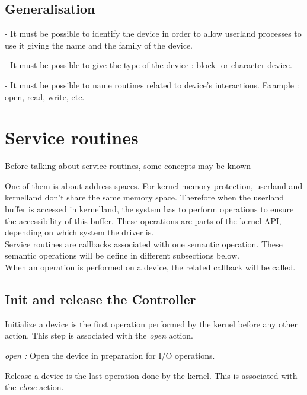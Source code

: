 \documentclass[11pt]{report}
\begin{document}
\subsection{Generalisation}
\begin{description}
  \item{- It must be possible to identify the device in order to allow userland processes
to use it giving the name and the family of the device.}
  \item{- It must be possible to give the type of the device : block- or character-device.}
  \item{- It must be possible to name routines related to device's interactions.
Example : open, read, write, etc.}
\end{description}

\section{Service routines}

Before talking about service routines, some concepts may be known

One of them is about address spaces. For kernel memory protection,
userland and kernelland don't share the same memory space. Therefore
when the userland buffer is accessed in kernelland, the system has to
perform operations to ensure the accessibility of this buffer. These operations
are parts of the kernel API, depending on which system the driver is.\\

Service routines are callbacks associated with one semantic operation.
These semantic operations will be define in different subsections below.\\

When an operation is performed on a device, the related callback will be called.\\

\subsection{Init and release the Controller}

Initialize a device is the first operation performed by the kernel
before any other action. This step is associated with the {\it open} action.

{\it open :} Open the device in preparation for I/O operations.


Release a device is the last operation done by the kernel. This is associated
with the {\it close}  action.
\end{document}
